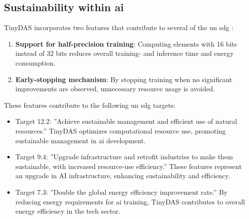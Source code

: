 \subsection{Sustainability within \acrshort{ai}}
TinyDAS incorporates two features that contribute to several of the \acrfull{un} \acrfull{sdg} \cite{UNSDGs}:
\begin{enumerate}
\item \textbf{Support for half-precision training}: Computing elements with 16 bits instead of 32 bits reduces overall training- and inference time and energy consumption.
\item \textbf{Early-stopping mechanism}: By stopping training when no significant improvements are observed, unnecessary resource usage is avoided.
\end{enumerate}
These features contribute to the following \acrshort{un} \acrshort{sdg} targets:
\begin{itemize}
\item Target 12.2: ''Achieve sustainable management and efficient use of natural resources.'' TinyDAS optimizes computational resource use, promoting sustainable management in \acrshort{ai} development.
\item Target 9.4: ''Upgrade infrastructure and retrofit industries to make them sustainable, with increased resource-use efficiency.'' These features represent an upgrade in AI infrastructure, enhancing sustainability and efficiency.
\item Target 7.3: ''Double the global energy efficiency improvement rate.'' By reducing energy requirements for \acrshort{ai} training, TinyDAS contributes to overall energy efficiency in the tech sector.
\end{itemize}